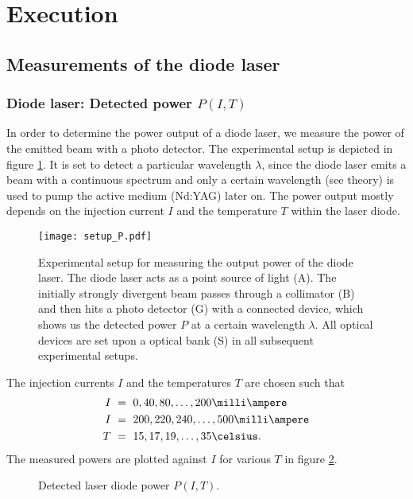 
\section{Execution}
\subsection{Measurements of the diode laser}
\subsubsection{Diode laser: Detected power $P(I,T)$}
In order to determine the power output of a diode laser, we measure the power of the emitted beam with a photo detector. The experimental setup is depicted in figure \ref{fig:setup_P}. It is set to detect a particular wavelength $\lambda$, since the diode laser emits a beam with a continuous spectrum and only a certain wavelength (see theory) is used to pump the active medium (Nd:YAG) later on. The power output mostly depends on the injection current $I$ and the temperature $T$ within the laser diode.

\begin{figure}[h]
	\centering
	\texttt{[image: setup\_P.pdf]}
	\caption[Measurement of the diode laser power]{Experimental setup for measuring the output power of the diode laser. The diode laser acts as a point source of light (A). The initially strongly divergent beam passes through a collimator (B) and then hits a photo detector (G) with a connected device, which shows us the detected power $P$ at a certain wavelength $\lambda$. All optical devices are set upon a optical bank (S) in all subsequent experimental setups. \cite{lit:manual}}
	\label{fig:setup_P}
\end{figure}

The injection currents $I$ and the temperatures $T$ are chosen such that
\begin{align*}
I~&=~0,40,80,\dots,200\milli\ampere\\
I~&=~200,220,240,\dots,500\milli\ampere\\
T~&=~15,17,19,\dots,35\celsius.
\end{align*}
The measured powers are plotted against $I$ for various $T$ in figure \ref{fig:measurement_P}.

\newpage

\begin{figure}[h]
	\centering
	
	\caption{Detected laser diode power $P(I,T)$.}
	\label{fig:measurement_P}
\end{figure}

